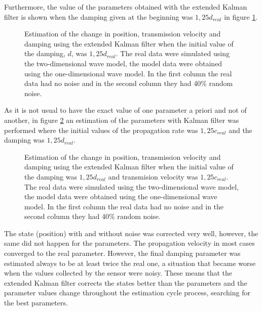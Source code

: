 \documentclass[12pt, a4paper]{article} %
\begin{document}
\newpage
Furthermore, the value of the parameters obtained with the extended Kalman filter is shown when the damping given at the beginning was $1,25 d_{real}$ in figure \ref{fig:kalman1d}.

\begin{figure}[h!]
    \centering
    
    \caption{Estimation of the change in position, transmission velocity and damping using the extended Kalman filter when the initial value of the damping, $d$, was $ 1,25 d_{real}$. The real data were simulated using the two-dimensional wave model, the model data were obtained using the one-dimensional wave model. In the first column the real data had no noise and in the second column they had 40\% random noise.}
    \label{fig:kalman1d}
\end{figure}

\newpage

As it is not usual to have the exact value of one parameter a priori and not of another, in figure \ref{fig:kalman1dc} an estimation of the parameters with Kalman filter was performed where the initial values of the propagation rate was $1,25 c_{real}$ and the damping was $1,25 d_{real}$.

\newpage

\begin{figure}[h!]
    \centering
    
    \caption{Estimation of the change in position, transmission velocity and damping using the extended Kalman filter when the initial value of the damping was $1,25 d_{real}$ and transmision velocity was $1,25 c_{real}$. The real data were simulated using the two-dimensional wave model, the model data were obtained using the one-dimensional wave model. In the first column the real data had no noise and in the second column they had 40\% random noise.}
    \label{fig:kalman1dc}
\end{figure}

The state (position) with and without noise was corrected very well, however, the same did not happen for the parameters. The propagation velocity in most cases converged to the real parameter. However, the final damping parameter was estimated always to be at least twice the real one, a situation that became worse when the values collected by the sensor were noisy. These means that the extended Kalman filter corrects the states better than the parameters and the parameter values change throughout the estimation cycle process, searching for the best parameters.
\newpage
\end{document}
